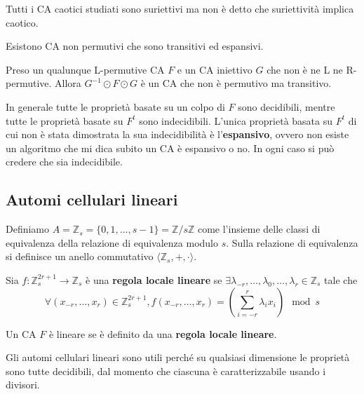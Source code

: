 \begin{nota}
    Tutti i CA caotici studiati sono suriettivi ma non è detto che suriettività
    implica caotico.
\end{nota}

\begin{nota}
    Esistono CA non permutivi che sono transitivi ed espansivi.

    Preso un qualunque L-permutive CA $F$ e un CA iniettivo $G$ che non è ne L ne R-permutive.
    Allora $G^{-1}\odot F\odot G$ è un CA che non è permutivo ma transitivo.
\end{nota}

In generale tutte le proprietà basate su un colpo di $F$ sono decidibili, mentre
tutte le proprietà basate su $F^t$ sono indecidibili. L'unica proprietà basata
su $F^t$ di cui non è stata dimostrata la sua indecidibilità è l'\textbf{espansivo},
ovvero non esiste un algoritmo che mi dica subito un CA è espansivo o no. In ogni
caso si può credere che sia indecidibile.

\subsection{Automi cellulari lineari}
Definiamo $A= \mathbb{Z}_s = \{0,1,\dots, s-1\} =\mathbb{Z}/s\mathbb{Z}$ come
l'insieme delle classi di equivalenza della relazione di equivalenza modulo $s$.
Sulla relazione di equivalenza si definisce un anello commutativo $\langle \mathbb{Z}_s,
    +, \cdot \rangle$.

\begin{definizione} 
    Sia $f:\mathbb{Z}_s^{2r+1}\rightarrow \mathbb{Z}_s$ è una \textbf{regola locale lineare} se  $\exists \lambda_{-r},
        \dots,\lambda_0,\dots,\lambda_r\in \mathbb{Z}_s$ tale che
    \begin{equation*}
        \forall (x_{-r},\dots, x_r)\in \mathbb{Z}_s^{2r+1}, f(x_{-r},\dots, x_r) = \left(\sum_{i=-r}^{r}\lambda_ix_i\right)\mod s
    \end{equation*}
\end{definizione}

\begin{definizione} 
    Un CA $F$ è lineare se è definito da una \textbf{regola locale lineare}.
\end{definizione}

Gli automi cellulari lineari sono utili perché su qualsiasi dimensione le proprietà
sono tutte decidibili, dal momento che ciascuna è caratterizzabile usando i divisori.

